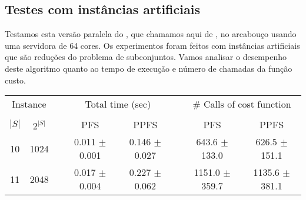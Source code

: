 \subsection{Testes com instâncias artificiais}
Testamos esta versão paralela do , que chamamos aqui de
, no arcabouço  usando uma servidora de
64 cores. Os experimentos foram feitos com instâncias artificiais que 
são reduções do problema de subconjuntos. Vamos analisar o desempenho 
deste algoritmo quanto ao tempo de execução e número de chamadas da 
função custo.

\begin{table}
\centering
\footnotesize
\begin{tabular}{cc c cc c cc}
\toprule
\multicolumn{2}{c}{Instance} & \phantom{} & \multicolumn{2}{c}{Total time (sec)} & \phantom{} & \multicolumn{2}{c}{\# Calls of cost function} \\
\cline{1-2}\cline{4-5}\cline{7-8}\\
$|S|$ & $2^{|S|}$ && PFS & PPFS && PFS & PPFS \\
10 &    1024 && 0.011 $\pm$ 0.001 & 0.146 $\pm$ 0.027 && 643.6 $\pm$ 133.0 & 626.5 $\pm$ 151.1 \\
11 &    2048 && 0.017 $\pm$ 0.004 & 0.227 $\pm$ 0.062 && 1151.0 $\pm$ 359.7 & 1135.6 $\pm$ 381.1 \\

\end{tabular}
\end{table}
